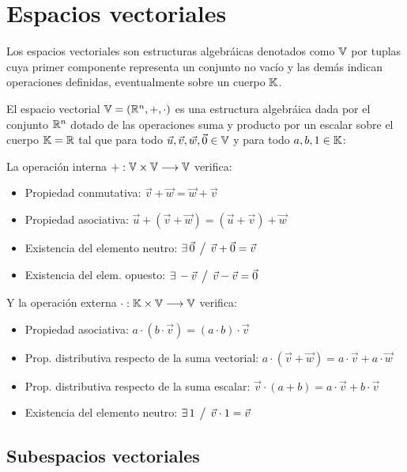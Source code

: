 \chapter{Espacios vectoriales}

Los espacios vectoriales son estructuras algebráicas denotados como $\mathbb{V}$ por tuplas cuya primer componente representa un conjunto no vacío y las demás indican operaciones definidas, eventualmente sobre un cuerpo $\mathbb{K}$.

El espacio vectorial $\mathbb{V}=(\mathbb{R}^n,+,\cdot)$ es una estructura algebráica dada por el conjunto $\mathbb{R}^n$ dotado de las operaciones suma y producto por un escalar sobre el cuerpo $\mathbb{K}=\mathbb{R}$ tal que para todo $ \Vec{u},\Vec{v},\Vec{w},\Vec{0} \in \mathbb{V}$ y para todo $a,b,1 \in \mathbb{K}$:

La operación interna $+:\mathbb{V} \times \mathbb{V} \longrightarrow \mathbb{V} $ verifica:

\begin{itemize}
    \item Propiedad conmutativa: $\Vec{v}+\Vec{w}=\Vec{w}+\Vec{v}$
    \item Propiedad asociativa: $\Vec{u} + \left( \Vec{v}+\Vec{w} \right) = \left( \Vec{u} + \Vec{v} \right) + \Vec{w}$
    \item Existencia del elemento neutro: $\exists \, \Vec{0} \hspace{1ex} \big/ \hspace{1ex} \Vec{v} + \Vec{0} = \Vec{v}$
    \item Existencia del elem. opuesto: $\exists \, -\Vec{v} \hspace{1ex} \big/ \hspace{1ex} \Vec{v} - \Vec{v} = \Vec{0}$
\end{itemize}

Y la operación externa $\cdot:\mathbb{K} \times \mathbb{V} \longrightarrow \mathbb{V}$ verifica:

\begin{itemize}
    \item Propiedad asociativa: $a \cdot \left( b \cdot \Vec{v} \right) = \left( a \cdot b \right) \cdot \Vec{v}$
    \item Prop. distributiva respecto de la suma vectorial: $a \cdot \left( \Vec{v} + \Vec{w} \right) = a \cdot \Vec{v} + a \cdot \Vec{w}$
    \item Prop. distributiva respecto de la suma escalar: $\Vec{v} \cdot \left(a+b\right) = a \cdot \Vec{v} + b \cdot \Vec{v}$
    \item Existencia del elemento neutro: $\exists \, 1 \hspace{1ex} \big/ \hspace{1ex} \Vec{v} \cdot 1 = \Vec{v}$
\end{itemize}


\section{Subespacios vectoriales}

